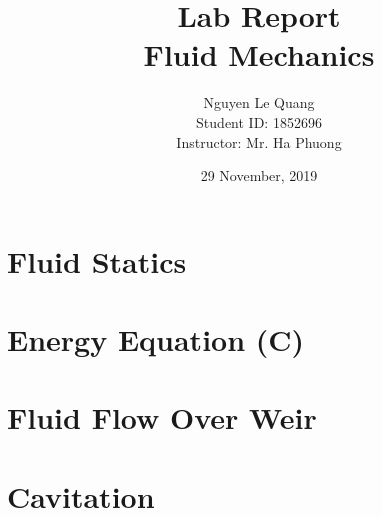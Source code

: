 \documentclass{presets}
\title{Lab Report\\Fluid Mechanics}
\author{Nguyen Le Quang\\Student ID: 1852696\\Instructor: Mr. Ha Phuong}
\date{29 November, 2019}
\begin{document}
	\maketitle
	
	\newpage
	
	\tableofcontents
	
	\newpage
	\section{Fluid Statics}
	
	
	\newpage
	\section{Energy Equation (C)}
	
	
	\newpage
	\section{Fluid Flow Over Weir}
	
	
	\newpage
	\section{Cavitation}
	
\end{document}

